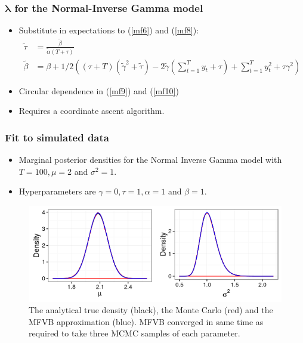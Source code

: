 \documentclass{beamer}\usepackage[]{graphicx}\usepackage[]{color}
\begin{document}
\begin{frame}
\frametitle{$\boldsymbol{\lambda}$ for the Normal-Inverse Gamma model}
\begin{itemize}
\item Substitute in expectations to (\ref{mf6}) and (\ref{mf8}):
\begin{align}
\tilde{\tau} &= \frac{\tilde{\beta}}{\tilde{\alpha}(T + \tau)} \label{mf9} \\
\tilde{\beta} &= \beta + 1/2\left((\tau + T)(\tilde{\gamma}^2 + \tilde{\tau}) - 2 \tilde{\gamma}\left(\sum_{t=1}^{T}y_t + \tau \right) + \sum_{t=1}^{T} y_t^2 + \tau \gamma^2 \right)\label{mf10}
\end{align}
\item Circular dependence in (\ref{mf9}) and (\ref{mf10}) 
\item Requires a coordinate ascent algorithm.
\end{itemize}
\end{frame}


\begin{frame}
\frametitle{Fit to simulated data}
\begin{itemize}
\item Marginal posterior densities for the Normal Inverse Gamma model with $T = 100, \mu = 2$ and $\sigma^2 = 1$.
\item Hyperparameters are $\gamma = 0, \tau = 1, \alpha = 1$ and $\beta = 1$. 
\end{itemize}
\begin{figure}[h]
\centering
\includegraphics[width=0.7\linewidth,height=\textheight,keepaspectratio]{norminvg}
\caption{The analytical true density (black), the Monte Carlo (red) and the MFVB approximation (blue). MFVB converged in same time as required to take three MCMC samples of each parameter.}
\label{fig:norminvg}
\end{figure}
\end{frame}
\end{document}
